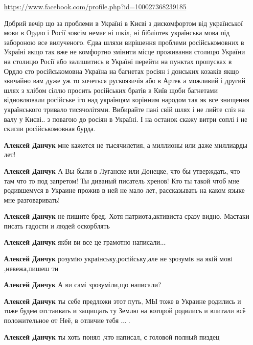 \begin{itemize}
{
\url{https://www.facebook.com/profile.php?id=100027368239185}

Добрий вечір що за проблеми в Україні в Києві з дискомфортом від української
мови в Ордло і Росії зовсім немає ні шкіл, ні бібліотек українська мова під
забороною все вилученого. Єдва шляхи вирішення проблеми російськомовних в
Україні якщо так вже не комфортно змінити місце проживання столицю України на
столицю Росії або залишитись в Україні перейти на пунктах пропусках в Ордло єто
російськомовна Україна на багнетах росіян і донських козаків якщо звичайно вам
дуже уж то хочеться рускоязичія або в Артек а можливий і другий шлях з хлібом
сіллю просить російських братів в Київ щоби багнетами відновлювали російське
іго над українцям корінним народом так як все знищення українського тривало
тисячолітями. Вибирайте пані свій шлях і не лийте сліз на валу у Києві.. з
повагою до росіян в Україні. І на останок скажу витри соплі і не скигли
російськомовная бурда.

\begin{itemize}

\textbf{Алексей Данчук} мне кажется не тысячилетия, а миллионы или даже миллиарды лет!

\textbf{Алексей Данчук} А Вы были в Луганске или Донецке, что бы утверждать,
что там что то под запретом! Ты диваный писатель хренов! Кто ты такой чтоб мне
родившемуся в Украине прожив в ней не мало лет, рассказывать на каком языке мне
разговаривать!

\textbf{Алексей Данчук} не пишите бред. Хотя патриота,активиста сразу видно.
Мастаки писать гадости и людей оскорблять

\textbf{Алексей Данчук} якби ви все це грамотно написали...

\textbf{Алексей Данчук} розумiю украiнську,росiйську,але не зрозумiв на якiй мовi ,невежа,пишеш ти

\textbf{Алексей Данчук} А ви самі зрозуміли,що написали?

\textbf{Алексей Данчук} ты себе предложи этот путь, МЫ тоже в Украине родились и тоже будем отстаивать и защищать ту Землю на которой родились и впитали всё положительное от Неё, в отличие тебя ... .

\textbf{Алексей Данчук} ты хоть понял ,что написал, с головой полный пиздец



\end{itemize}}
\end{itemize}
